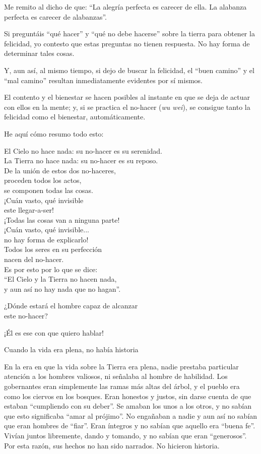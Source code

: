 \documentclass[book,b5paper,hidelinks,final]{memoir}
\begin{document}
	Me remito al dicho de que: ``La alegría perfecta es carecer de ella. La
	alabanza perfecta es carecer de alabanzas''.
	
	Si preguntáis ``qué hacer'' y ``qué no debe hacerse'' sobre la tierra
	para obtener la felicidad, yo contesto que estas preguntas no tienen
	respuesta. No hay forma de determinar tales cosas.
	
	Y, aun así, al mismo tiempo, si dejo de buscar la felicidad, el ``buen
	camino'' y el ``mal camino'' resultan inmediatamente evidentes por sí
	mismos.
	
	El contento y el bienestar se hacen posibles al instante en que se deja
	de actuar con ellos en la mente; y, si se practica el no-hacer (\textit{wu
		wei}), se consigue tanto la felicidad como el bienestar,
	automáticamente.
	
	He aquí cómo resumo todo esto:
	
	El Cielo no hace nada: su no-hacer es su serenidad.\\
	La Tierra no hace nada: su no-hacer es su reposo.\\
	De la unión de estos dos no-haceres,\\
	proceden todos los actos,\\
	se componen todas las cosas.\\
	¡Cuán vasto, qué invisible\\
	este llegar-a-ser!\\
	¡Todas las cosas van a ninguna parte!\\
	¡Cuán vasto, qué invisible...\\
	no hay forma de explicarlo!\\
	Todos los seres en su perfección\\
	nacen del no-hacer.\\
	Es por esto por lo que se dice:\\
	``El Cielo y la Tierra no hacen nada,\\
	y aun así no hay nada que no hagan''.
	
	¿Dónde estará el hombre capaz de alcanzar\\
	este no-hacer?
	
	¡Él es ese con que quiero hablar!
	
	Cuando la vida era plena, no había historia
	
	En la era en que la vida sobre la Tierra era plena, nadie prestaba
	particular atención a los hombres valiosos, ni señalaba al hombre de
	habilidad. Los gobernantes eran simplemente las ramas más altas del
	árbol, y el pueblo era como los ciervos en los bosques. Eran honestos y
	justos, sin darse cuenta de que estaban ``cumpliendo con su deber''. Se
	amaban los unos a los otros, y no sabían que esto significaba ``amar al
	prójimo''. No engañaban a nadie y aun así no sabían que eran hombres de
	``fiar''. Eran íntegros y no sabían que aquello era ``buena fe''. Vivían
	juntos libremente, dando y tomando, y no sabían que eran ``generosos''.
	Por esta razón, sus hechos no han sido narrados. No hicieron historia.
	
\end{document}
